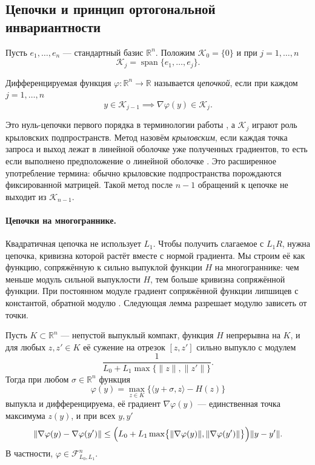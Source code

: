 \documentclass[11pt,a4paper]{article}
\newcommand{\R}{\mathbb R}
\newcommand{\F}{\mathcal F}
\newcommand{\ip}[2]{\langle #1,#2\rangle}
\newcommand{\norm}[1]{\|#1\|}
\begin{document}
\subsection{Цепочки и принцип ортогональной инвариантности}\label{sec:chains}

Пусть $e_1,\dots,e_n$ --- стандартный базис $\R^n$. Положим $\mathcal K_0=\{0\}$ и при $j=1,\dots,n$
\[
 \mathcal K_j=\operatorname{span}\{e_1,\dots,e_j\}.
\]

\begin{definition}[цепочка]\label{def:zero-chain}
Дифференцируемая функция $\varphi:\R^n\to\R$ называется \emph{цепочкой}, если при каждом $j=1,\dots,n$
\begin{equation}\label{eq:coord-chain}
 y\in\mathcal K_{j-1}\implies\nabla\varphi(y)\in\mathcal K_j .
\end{equation}
\end{definition}

Это нуль-цепочки первого порядка в терминологии работы \citet{carmon2020lower}, а $\mathcal K_j$ играют роль крыловских подпространств. Метод назовём \emph{крыловским}, если каждая точка запроса и выход лежат в линейной оболочке уже полученных градиентов, то есть если выполнено предположение о линейной оболочке \citep[предположение~2.1.4]{nesterov2018lectures}. Это расширенное употребление термина: обычно крыловские подпространства порождаются фиксированной матрицей. Такой метод после $n-1$ обращений к цепочке не выходит из $\mathcal K_{n-1}$.

\paragraph{Цепочки на многограннике.} Квадратичная цепочка не использует $L_1$. Чтобы получить слагаемое с $L_1R$, нужна цепочка, кривизна которой растёт вместе с нормой градиента. Мы строим её как функцию, сопряжённую к сильно выпуклой функции $H$ на многограннике: чем меньше модуль сильной выпуклости $H$, тем больше кривизна сопряжённой функции. При постоянном модуле градиент сопряжённой функции липшицев с константой, обратной модулю \citep[теорема~6.1.1]{nesterov2018lectures}. Следующая лемма разрешает модулю зависеть от точки.

\begin{lemma}\label{lem:conj}
Пусть $K\subset\R^n$ --- непустой выпуклый компакт, функция $H$ непрерывна на $K$, и для любых $z,z'\in K$ её сужение на отрезок $[z,z']$ сильно выпукло с модулем
\[
 \frac1{L_0+L_1\max\{\norm z,\norm{z'}\}} .
\]
Тогда при любом $\sigma\in\R^n$ функция
\[
 \varphi(y)=\max_{z\in K}\bigl\{\ip{y+\sigma}z-H(z)\bigr\}
\]
выпукла и дифференцируема, её градиент $\nabla\varphi(y)$ --- единственная точка максимума $z(y)$, и при всех $y,y'$
\begin{equation}\label{eq:conj-lip}
 \norm{\nabla\varphi(y)-\nabla\varphi(y')}\le\Bigl(L_0+L_1\max\bigl\{\norm{\nabla\varphi(y)},\norm{\nabla\varphi(y')}\bigr\}\Bigr)\norm{y-y'} .
\end{equation}
В частности, $\varphi\in\F_{L_0,L_1}^n$.
\end{lemma}
\end{document}
